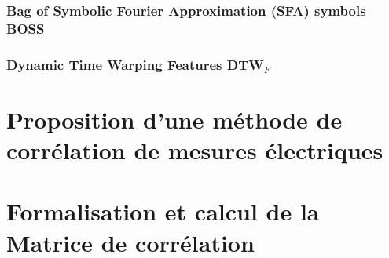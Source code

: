 			\subsubsection{Bag of Symbolic Fourier Approximation (SFA) symbols BOSS}
			\subsubsection{Dynamic Time Warping Features DTW$_{F}$}
			
	\section{Proposition d'une m\'ethode de corr\'elation de mesures \'electriques}
	
	\section{Formalisation et calcul de la Matrice de corr\'elation}